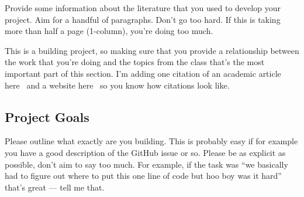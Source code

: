 Provide some information about the literature that you used to develop your project. Aim for a handful of paragraphs. 
Don't go too hard. 
If this is taking more than half a page (1-column), you're doing too much.

This is a building project, so making sure that you provide a relationship between the work that you're doing and the topics from the class that's the most important part of this section.
I'm adding one citation of an academic article here~\cite{dong2023behind} and a website here~\cite{least-weird-forum-user} so you know how citations look like.

\subsection{Project Goals}

Please outline what exactly are you building.
This is probably easy if for example you have a good description of the GitHub issue or so.
Please be as explicit as possible, don't aim to say too much.
For example, if the task was ``we basically had to figure out where to put this one line of code but hoo boy was it hard'' that's great --- tell me that.
